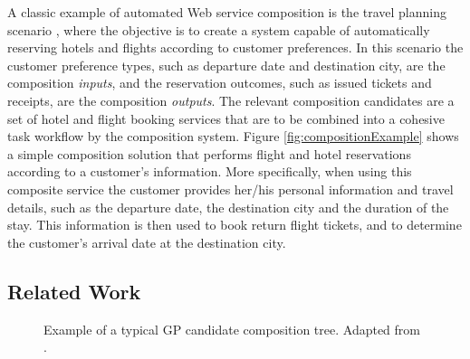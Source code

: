 \documentclass{article}
\begin{document}
A classic example of automated Web service composition is the travel planning scenario \cite{srivastava2003web}, where the objective is to create a system capable of
automatically reserving hotels and flights according to customer preferences. In this scenario the customer preference types, such as departure date and destination
city, are the composition \textit{inputs}, and the reservation outcomes, such as issued tickets and receipts, are the composition \textit{outputs}. The relevant composition
candidates are a set of hotel and flight booking services that are to be combined into a cohesive task workflow by the composition system. Figure \ref{fig:compositionExample} shows a simple composition solution that performs flight and hotel reservations according to a customer's information. More specifically, when using this composite service 
the customer provides her/his personal information and travel details, such as the departure date, the destination city and the duration of the stay. This information is
then used to book return flight tickets, and to determine the customer's arrival date at the destination city.

\subsection{Related Work}

\begin{figure}
\centerline{
}
\caption{Example of a typical GP candidate composition tree. Adapted from \protect\cite{aversano2006genetic}.}
\label{fig:treeExample}
\end{figure}
\end{document}
